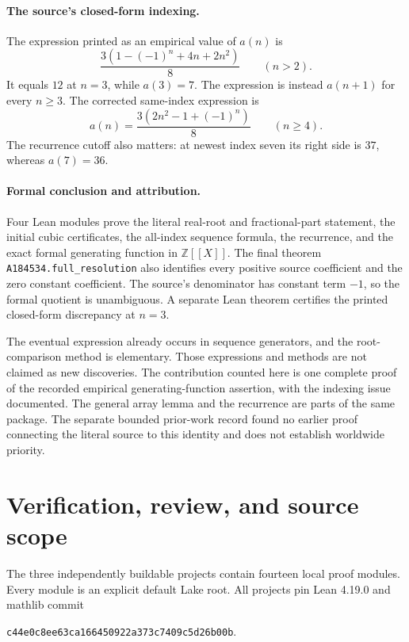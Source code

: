 \documentclass[11pt]{article}
\begin{document}
\paragraph{The source's closed-form indexing.}
The expression printed as an empirical value of $a(n)$ is
\[
 \frac{3(1-(-1)^n+4n+2n^2)}8\qquad(n>2).
\]
It equals $12$ at $n=3$, while $a(3)=7$. The expression is instead
$a(n+1)$ for every $n\ge3$. The corrected same-index expression is
\[
 a(n)=\frac{3(2n^2-1+(-1)^n)}8\qquad(n\ge4).
\]
The recurrence cutoff also matters: at newest index seven its right
side is $37$, whereas $a(7)=36$.

\paragraph{Formal conclusion and attribution.}
Four Lean modules prove the literal real-root and fractional-part
statement, the initial cubic certificates, the all-index sequence
formula, the recurrence, and the exact formal generating function in
$\mathbb Z[[X]]$. The final theorem \texttt{A184534.full\_resolution}
also identifies every positive source coefficient and the zero
constant coefficient. The source's denominator has constant term
$-1$, so the formal quotient is unambiguous. A separate Lean theorem
certifies the printed closed-form discrepancy at $n=3$.

The eventual expression already occurs in sequence generators, and
the root-comparison method is elementary. Those expressions and
methods are not claimed as new discoveries. The contribution counted
here is one complete proof of the recorded empirical generating-function
assertion, with the indexing issue documented. The general array lemma
and the recurrence are parts of the same package. The separate bounded
prior-work record found no earlier proof connecting the literal source
to this identity and does not establish worldwide priority.

\section{Verification, review, and source scope}

The three independently buildable projects contain fourteen local proof
modules. Every module is an explicit default Lake root. All projects pin
Lean 4.19.0 and mathlib commit
\begin{center}
\texttt{c44e0c8ee63ca166450922a373c7409c5d26b00b}.
\end{center}
\end{document}
